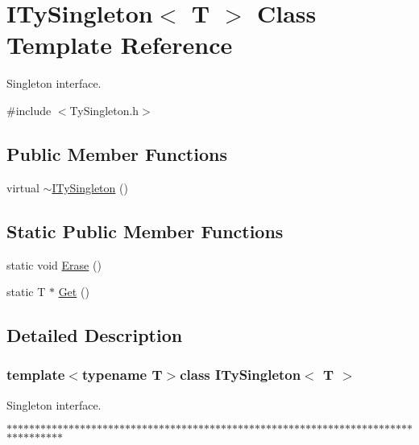 \hypertarget{class_i_ty_singleton}{
\section{ITySingleton$<$ T $>$ Class Template Reference}
\label{class_i_ty_singleton}
}


Singleton interface.  




{\ttfamily \#include $<$TySingleton.h$>$}

\subsection*{Public Member Functions}
\begin{DoxyCompactItemize}
\item 
virtual \hyperlink{class_i_ty_singleton_a0ca9e31f3b20e750a93c98203b73b659}{$\sim$ITySingleton} ()
\end{DoxyCompactItemize}
\subsection*{Static Public Member Functions}
\begin{DoxyCompactItemize}
\item 
static void \hyperlink{class_i_ty_singleton_a0ce782de119a27e5536b1e5864e82760}{Erase} ()
\item 
static T $\ast$ \hyperlink{class_i_ty_singleton_a5d52feebb9fe09f67611470e417c006b}{Get} ()
\end{DoxyCompactItemize}


\subsection{Detailed Description}
\subsubsection*{template$<$typename T$>$class ITySingleton$<$ T $>$}

Singleton interface. 

$\ast$$\ast$$\ast$$\ast$$\ast$$\ast$$\ast$$\ast$$\ast$$\ast$$\ast$$\ast$$\ast$$\ast$$\ast$$\ast$$\ast$$\ast$$\ast$$\ast$$\ast$$\ast$$\ast$$\ast$$\ast$$\ast$$\ast$$\ast$$\ast$$\ast$$\ast$$\ast$$\ast$$\ast$$\ast$$\ast$$\ast$$\ast$$\ast$$\ast$$\ast$$\ast$$\ast$$\ast$$\ast$$\ast$$\ast$$\ast$$\ast$$\ast$$\ast$$\ast$$\ast$$\ast$$\ast$$\ast$$\ast$$\ast$$\ast$$\ast$$\ast$$\ast$$\ast$$\ast$$\ast$$\ast$$\ast$$\ast$$\ast$$\ast$$\ast$$\ast$$\ast$$\ast$$\ast$$\ast$$\ast$$\ast$$\ast$$\ast$$\ast$$\ast$


